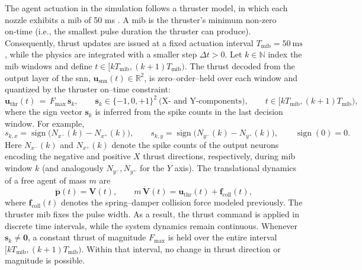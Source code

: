 The agent actuation in the simulation follows a thruster model, in which each nozzle exhibits a \ac{mib} of 50 ms \cite{botelho2024explicit}. A \ac{mib} is the thruster's minimum non‑zero on‑time (i.e., the smallest pulse duration the thruster can produce). Consequently, thrust updates are issued at a fixed actuation interval $T_{\mathrm{mib}}=50\ \mathrm{ms}$, while the physics are integrated with a smaller step $\Delta t>0$. Let $k\in\mathbb{N}$ index the \ac{mib} windows and define $t\in[kT_{\mathrm{mib}},(k{+}1)T_{\mathrm{mib}})$. The thrust decoded from the output layer of the \ac{snn}, $\mathbf{u}_{\mathrm{snn}}(t)\in\mathbb{R}^2$, is zero–order–held over each window and quantized by the thruster on–time constraint:
\begin{equation}
\mathbf{u}_{\mathrm{thr}}(t)
\,=\,F_{\max}\,\mathbf{s}_k,\qquad
\mathbf{s}_k\in\{-1,0,+1\}^2\ \text{(X- and Y-components)},\qquad
 t\in[kT_{\mathrm{mib}},(k{+}1)T_{\mathrm{mib}}),
\label{eq:MIB-thrust}
\end{equation}
where the sign vector $\mathbf{s}_k$ is inferred from the spike counts in the last decision window. For example,
\begin{equation*}
s_{k,x}=\operatorname{sign}\big(N_{x^-}(k)-N_{x^+}(k)\big),\qquad
s_{k,y}=\operatorname{sign}\big(N_{y^-}(k)-N_{y^+}(k)\big),\qquad \operatorname{sign}(0)=0.
\end{equation*}
Here $N_{x^-}(k)$ and $N_{x^+}(k)$ denote the spike counts of the output neurons encoding the negative and positive $X$ thrust directions, respectively, during \ac{mib} window $k$ (and analogously $N_{y^-},N_{y^+}$ for the $Y$ axis). The translational dynamics of a free agent of mass $m$ are
\begin{equation}
\dot{\mathbf{p}}(t)=\mathbf{V}(t),\qquad
m\,\dot{\mathbf{V}}(t)=\mathbf{u}_{\mathrm{thr}}(t)+\mathbf{f}_{\mathrm{coll}}(t),
\end{equation}
where $\mathbf{f}_{\mathrm{coll}}(t)$ denotes the spring–damper collision force modeled previously. 
The thruster \ac{mib} fixes the pulse width. As a result, the thrust command is applied in discrete time intervals, while the system dynamics remain continuous. Whenever $\mathbf{s}_k \neq \mathbf{0}$, a constant thrust of magnitude $F_{\max}$ is held over the entire interval $[kT_{\mathrm{mib}}, (k{+}1)T_{\mathrm{mib}})$. Within that interval, no change in thrust direction or magnitude is possible.


